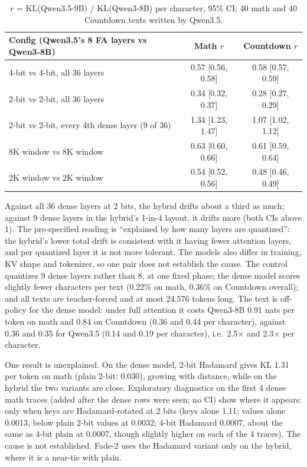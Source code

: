 \documentclass{article}
\begin{document}
\begin{table}[H]
\caption{$r$ = KL(Qwen3.5-9B) / KL(Qwen3-8B) per character, 95\% CI; 40 math and 40 Countdown texts written by Qwen3.5.}
\centering
\small
\begin{tabular}{@{}lcc@{}}
\toprule
Config (Qwen3.5's 8 FA layers vs Qwen3-8B) & Math $r$ & Countdown $r$ \\
\midrule
4-bit vs 4-bit, all 36 layers & 0.57 [0.56, 0.58] & 0.58 [0.57, 0.59] \\
2-bit vs 2-bit, all 36 layers & 0.34 [0.32, 0.37] & 0.28 [0.27, 0.29] \\
2-bit vs 2-bit, every 4th dense layer (9 of 36) & 1.34 [1.23, 1.47] & 1.07 [1.02, 1.12] \\
8K window vs 8K window & 0.63 [0.60, 0.66] & 0.61 [0.59, 0.64] \\
2K window vs 2K window & 0.54 [0.52, 0.56] & 0.48 [0.46, 0.49] \\
\bottomrule
\end{tabular}
\end{table}

Against all 36 dense layers at 2 bits, the hybrid drifts about a third as much; against 9 dense layers in the hybrid's 1-in-4 layout, it drifts more (both CIs above 1). The pre-specified reading is ``explained by how many layers are quantized'': the hybrid's lower total drift is consistent with it having fewer attention layers, and per quantized layer it is not more tolerant. The models also differ in training, KV shape and tokenizer, so one pair does not establish the cause. The control quantizes 9 dense layers rather than 8, at one fixed phase; the dense model scores slightly fewer characters per text (0.22\% on math, 0.36\% on Countdown overall); and all texts are teacher-forced and at most 24,576 tokens long. The text is off-policy for the dense model: under full attention it costs Qwen3-8B 0.91 nats per token on math and 0.84 on Countdown (0.36 and 0.44 per character), against 0.36 and 0.35 for Qwen3.5 (0.14 and 0.19 per character), i.e.\ 2.5$\times$ and 2.3$\times$ per character.

One result is unexplained. On the dense model, 2-bit Hadamard gives KL 1.31 per token on math (plain 2-bit: 0.030), growing with distance, while on the hybrid the two variants are close. Exploratory diagnostics on the first 4 dense math traces (added after the dense rows were seen; no CI) show where it appears: only when keys are Hadamard-rotated at 2 bits (keys alone 1.11; values alone 0.0013, below plain 2-bit values at 0.0032; 4-bit Hadamard 0.0007, about the same as 4-bit plain at 0.0007, though slightly higher on each of the 4 traces). The cause is not established. Fade-2 uses the Hadamard variant only on the hybrid, where it is a near-tie with plain.
\end{document}
